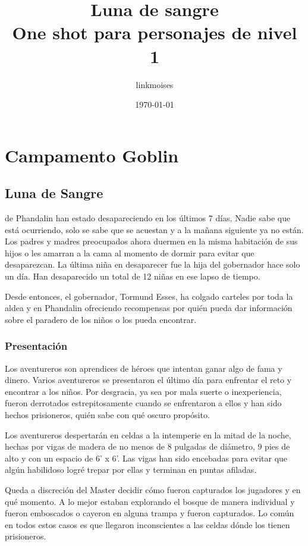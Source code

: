 \documentclass[10pt,twoside,twocolumn,openany]{dndbook}
\title{Luna de sangre\\
\large One shot para personajes de nivel 1}
\author{linkmoises}
\date{\today}
\begin{document}
\frontmatter

\maketitle


\part{Campamento Goblin}

\chapter{Luna de Sangre}

 de Phandalin han estado desapareciendo en los últimos 7 días. Nadie sabe que está ocurriendo, solo se sabe que se acuestan y a la mañana siguiente ya no están. Los padres y madres preocupados ahora duermen en la misma habitación de sus hijos o les amarran a la cama al momento de dormir para evitar que desaparezcan. La última niña en desaparecer fue la hija del gobernador hace solo un día. Han desaparecido un total de 12 niñas en ese lapso de tiempo.

Desde entonces, el gobernador, Tormund Esses, ha colgado carteles por toda la aldea y en Phandalin ofreciendo recompensas por quién pueda dar información sobre el paradero de los niños o los pueda encontrar.

\section{Presentación}

Los aventureros son aprendices de héroes que intentan ganar algo de fama y dinero. Varios aventureros se presentaron el último día para enfrentar el reto y encontrar a los niños. Por desgracia, ya sea por mala suerte o inexperiencia, fueron derrotados estrepitosamente cuando se enfrentaron a ellos y han sido hechos prisioneros, quién sabe con qué oscuro propósito.

Los aventureros despertarán en celdas a la intemperie en la mitad de la noche, hechas por vigas de madera de no menos de 8 pulgadas de diámetro, 9 pies de alto y con un espacio de 6' x 6'. Las vigas han sido encebadas para evitar que algún habilidoso logré trepar por ellas y terminan en puntas afiladas.

Queda a discreción del Master decidir cómo fueron capturados los jugadores y en qué momento. A lo mejor estaban explorando el bosque de manera individual y fueron emboscados o cayeron en alguna trampa y fueron capturados. Lo común en todos estos casos es que llegaron inconscientes a las celdas dónde los tienen prisioneros.
\end{document}
